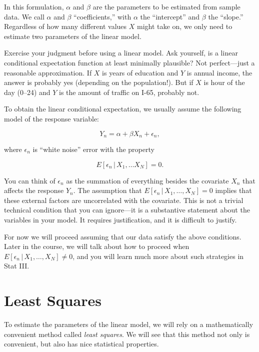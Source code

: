 \documentclass[12pt,oneside,openany]{book}
\begin{document}
In this formulation, \(\alpha\) and \(\beta\) are the parameters to be
estimated from sample data. We call \(\alpha\) and \(\beta\)
``coefficients,'' with \(\alpha\) the ``intercept'' and \(\beta\) the
``slope.'' Regardless of how many different values \(X\) might take on,
we only need to estimate two parameters of the linear model.

Exercise your judgment before using a linear model. Ask yourself, is a
linear conditional expectation function at least minimally plausible?
Not perfect---just a reasonable approximation. If \(X\) is years of
education and \(Y\) is annual income, the answer is probably yes
(depending on the population!). But if \(X\) is hour of the day (0--24)
and \(Y\) is the amount of traffic on I-65, probably not.

To obtain the linear conditional expectation, we usually assume the
following model of the response variable:

\begin{equation}
Y_n = \alpha + \beta X_n + \epsilon_n,
\end{equation}

where \(\epsilon_n\) is ``white noise'' error with the property

\begin{equation}
E[\epsilon_n \,|\, X_1, \ldots X_N] = 0.
\end{equation}

You can think of \(\epsilon_n\) as the summation of everything besides
the covariate \(X_n\) that affects the response \(Y_n\). The assumption
that \(E[\epsilon_n \,|\, X_1, \ldots, X_N] = 0\) implies that these
external factors are uncorrelated with the covariate. This is not a
trivial technical condition that you can ignore---it is a substantive
statement about the variables in your model. It requires justification,
and it is difficult to justify.

For now we will proceed assuming that our data satisfy the above
conditions. Later in the course, we will talk about how to proceed when
\(E[\epsilon_n \,|\, X_1, \ldots, X_N] \neq 0\), and you will learn much
more about such strategies in Stat III.

\section{Least Squares}\label{least-squares}

To estimate the parameters of the linear model, we will rely on a
mathematically convenient method called \emph{least squares}. We will
see that this method not only is convenient, but also has nice
statistical properties.
\end{document}
